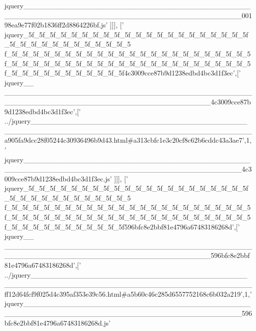 \begin{DoxyCode}
{      jquery\_\_\_\_\_\_\_\_\_\_\_\_\_\_\_\_\_\_\_\_\_\_\_\_\_\_\_\_\_\_\_\_\_\_\_\_\_\_\_\_\_\_\_\_\_\_\_\_\_\_\_\_\_\_\_\_\_\_\_\_\_\_\_\_\_\_\_\_\_\_\_\_\_\_\_\_\_\_\_\_\_\_\_\_\_\_\_\_\_\_00198ea9e77f02b1836ff2d8864226bf.js'}
      ]]],
  [\textcolor{stringliteral}{'
      jquery\_5f\_5f\_5f\_5f\_5f\_5f\_5f\_5f\_5f\_5f\_5f\_5f\_5f\_5f\_5f\_5f\_5f\_5f\_5f\_5f\_5f\_5f\_5f\_5f\_5f\_5f\_5f\_5f\_5f\_5f\_5f\_5f\_5
      f\_5f\_5f\_5f\_5f\_5f\_5f\_5f\_5f\_5f\_5f\_5f\_5f\_5f\_5f\_5f\_5f\_5f\_5f\_5f\_5f\_5f\_5f\_5f\_5f\_5f\_5f\_5f\_5f\_5f\_5f\_5f\_5f\_5f\_5f\_5f\_5f\_5f\_5f\_5f\_5f\_5f\_5f\_5f\_5f\_5f\_5f\_5f\_5f\_5f\_5f\_5f\_5f\_5f\_5f\_5f\_5f\_5f4c3009cce87b9d1238edbd4bc3d1f3ec'},[\textcolor{stringliteral}{'
      jquery\_\_
      \_\_\_\_\_\_\_\_\_\_\_\_\_\_\_\_\_\_\_\_\_\_\_\_\_\_\_\_\_\_\_\_\_\_\_\_\_\_\_\_\_\_\_\_\_\_\_\_\_\_\_\_\_\_\_\_\_\_\_\_\_\_\_\_\_\_\_\_\_\_\_\_\_\_\_\_\_\_\_\_\_\_\_\_\_\_\_\_4c3009cce87b9d1238edbd4bc3d1f3ec'},[\textcolor{stringliteral}{'
      ../jquery\_\_\_\_\_\_\_\_\_\_\_\_\_\_\_\_\_\_\_\_\_\_\_\_\_\_\_\_\_\_\_\_\_\_\_\_\_\_\_\_\_\_\_\_\_\_\_\_\_\_\_\_\_\_\_\_\_\_\_\_\_\_\_\_\_\_\_\_\_\_\_\_\_\_\_\_\_\_\_\_\_\_\_\_\_\_\_\_\_\_a905fa9dcc28f05244c30936496b9d43.html#a313cbfc1e3c20cf8c62b6cddc43a3ae7'},1,\textcolor{stringliteral}{'
      jquery\_\_\_\_\_\_\_\_\_\_\_\_\_\_\_\_\_\_\_\_\_\_\_\_\_\_\_\_\_\_\_\_\_\_\_\_\_\_\_\_\_\_\_\_\_\_\_\_\_\_\_\_\_\_\_\_\_\_\_\_\_\_\_\_\_\_\_\_\_\_\_\_\_\_\_\_\_\_\_\_\_\_\_\_\_\_\_\_\_\_4c3009cce87b9d1238edbd4bc3d1f3ec.js'}
      ]]],
  [\textcolor{stringliteral}{'
      jquery\_5f\_5f\_5f\_5f\_5f\_5f\_5f\_5f\_5f\_5f\_5f\_5f\_5f\_5f\_5f\_5f\_5f\_5f\_5f\_5f\_5f\_5f\_5f\_5f\_5f\_5f\_5f\_5f\_5f\_5f\_5f\_5f\_5
      f\_5f\_5f\_5f\_5f\_5f\_5f\_5f\_5f\_5f\_5f\_5f\_5f\_5f\_5f\_5f\_5f\_5f\_5f\_5f\_5f\_5f\_5f\_5f\_5f\_5f\_5f\_5f\_5f\_5f\_5f\_5f\_5f\_5f\_5f\_5f\_5f\_5f\_5f\_5f\_5f\_5f\_5f\_5f\_5f\_5f\_5f\_5f\_5f\_5f\_5f\_5f\_5f\_5f\_5f\_5f\_5f\_5f596bfc8e2bbf81e4796a67483186268d'},[\textcolor{stringliteral}{'
      jquery\_\_
      \_\_\_\_\_\_\_\_\_\_\_\_\_\_\_\_\_\_\_\_\_\_\_\_\_\_\_\_\_\_\_\_\_\_\_\_\_\_\_\_\_\_\_\_\_\_\_\_\_\_\_\_\_\_\_\_\_\_\_\_\_\_\_\_\_\_\_\_\_\_\_\_\_\_\_\_\_\_\_\_\_\_\_\_\_\_\_\_596bfc8e2bbf81e4796a67483186268d'},[\textcolor{stringliteral}{'
      ../jquery\_\_\_\_\_\_\_\_\_\_\_\_\_\_\_\_\_\_\_\_\_\_\_\_\_\_\_\_\_\_\_\_\_\_\_\_\_\_\_\_\_\_\_\_\_\_\_\_\_\_\_\_\_\_\_\_\_\_\_\_\_\_\_\_\_\_\_\_\_\_\_\_\_\_\_\_\_\_\_\_\_\_\_\_\_\_\_\_\_\_ff12d64fcf9f025d4c395af353e39c56.html#a5b60c46c285d6557752168c6b032a219'},1,\textcolor{stringliteral}{'
      jquery\_\_\_\_\_\_\_\_\_\_\_\_\_\_\_\_\_\_\_\_\_\_\_\_\_\_\_\_\_\_\_\_\_\_\_\_\_\_\_\_\_\_\_\_\_\_\_\_\_\_\_\_\_\_\_\_\_\_\_\_\_\_\_\_\_\_\_\_\_\_\_\_\_\_\_\_\_\_\_\_\_\_\_\_\_\_\_\_\_\_596bfc8e2bbf81e4796a67483186268d.js'}

\end{DoxyCode}
